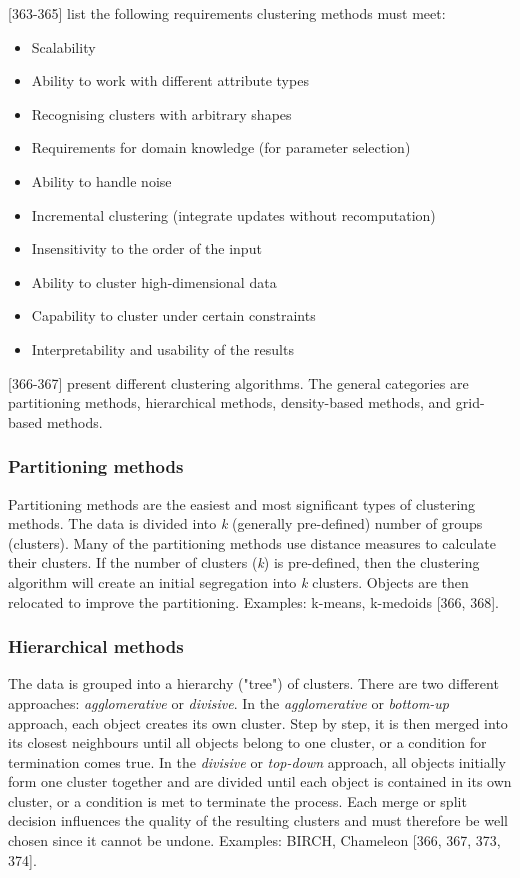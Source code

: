 \textcite{han2011data}[363-365] list the following requirements  clustering methods must meet:
\begin{itemize}
  \item Scalability
  \item Ability to work with different attribute types
  \item Recognising clusters with arbitrary shapes
  \item Requirements for domain knowledge (for parameter selection)
  \item Ability to handle noise
  \item Incremental clustering (integrate updates without recomputation)
  \item Insensitivity to the order of the input
  \item Ability to cluster high-dimensional data 
  \item Capability to cluster under certain constraints
  \item Interpretability and usability of the results
\end{itemize}


\textcite{han2011data}[366-367] present different clustering algorithms. The general categories are partitioning methods, hierarchical methods, density-based methods, and grid-based methods.

\subsubsection{Partitioning methods}
Partitioning methods are the easiest and most significant types of clustering methods. The data is divided into \textit{k} (generally pre-defined) number of groups (clusters). Many of the partitioning methods use distance measures to calculate their clusters. If the number of clusters (\textit{k}) is pre-defined, then the clustering algorithm will create an initial segregation into \textit{k} clusters. Objects are then relocated to improve the partitioning. Examples: k-means, k-medoids \autocite{han2011data}[366, 368].


\subsubsection{Hierarchical methods}
The data is grouped into a hierarchy ("tree") of clusters. There are two different approaches: \textit{agglomerative} or \textit{divisive}. In the \textit{agglomerative} or \textit{bottom-up} approach, each object creates its own cluster. Step by step, it is then merged into its closest neighbours until all objects belong to one cluster, or a condition for termination comes true. In the \textit{divisive} or \textit{top-down} approach, all objects initially form one cluster together and are divided until each object is contained in its own cluster, or a condition is met to terminate the process. Each merge or split decision influences the quality of the resulting clusters and must therefore be well chosen since it cannot be undone. Examples: BIRCH, Chameleon \autocite{han2011data}[366, 367, 373, 374].

